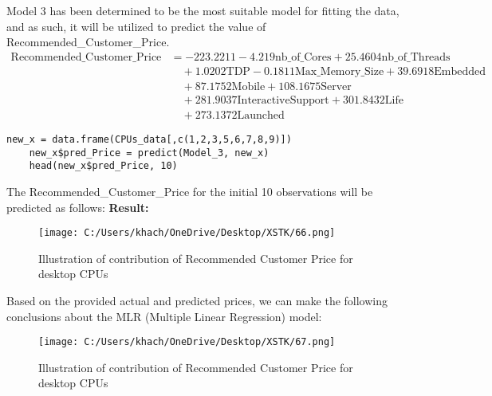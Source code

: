 \documentclass[a4paper]{article}
\begin{document}
	Model 3 has been determined to be the most suitable model for fitting the data, and as such, it will be utilized to predict the value of Recommended\_Customer\_Price.
	\begin{align*}
	\text{Recommended\_Customer\_Price} &= -223.2211 - 4.219 \text{nb\_of\_Cores} + 25.4604 \text{nb\_of\_Threads} \\
	&\quad + 1.0202 \text{TDP} - 0.1811 \text{Max\_Memory\_Size} + 39.6918 \text{Embedded} \\
	&\quad + 87.1752 \text{Mobile} + 108.1675 \text{Server} \\
	&\quad + 281.9037 \text{InteractiveSupport} + 301.8432 \text{Life} \\
	&\quad + 273.1372 \text{Launched}
	\end{align*}
	\begin{lstlisting}[frame=single, backgroundcolor=\color{gray!10}, breaklines=true, columns=fullflexible]
	new_x = data.frame(CPUs_data[,c(1,2,3,5,6,7,8,9)])
	new_x$pred_Price = predict(Model_3, new_x)
	head(new_x$pred_Price, 10)
	\end{lstlisting}
	The Recommended\_Customer\_Price for the initial 10 observations will be predicted as follows:
	\textbf{Result:}
	\begin{figure}[htbp]
		\centering
		\begin{adjustbox}{width=0.7\textwidth, frame}
			\texttt{[image: C:/Users/khach/OneDrive/Desktop/XSTK/66.png]}
		\end{adjustbox}
		\captionsetup{justification=centering}
		\vspace{0.5cm}
		\caption{Illustration of contribution of Recommended Customer Price for desktop CPUs}
	\end{figure}
	Based on the provided actual and predicted prices, we can make the following conclusions about the MLR (Multiple Linear Regression) model:
		\begin{figure}[htbp]
		\centering
		\begin{adjustbox}{width=0.7\textwidth, frame}
			\texttt{[image: C:/Users/khach/OneDrive/Desktop/XSTK/67.png]}
		\end{adjustbox}
		\captionsetup{justification=centering}
		\vspace{0.5cm}
		\caption{Illustration of contribution of Recommended Customer Price for desktop CPUs}
	\end{figure}
	\newpage
\end{document}
